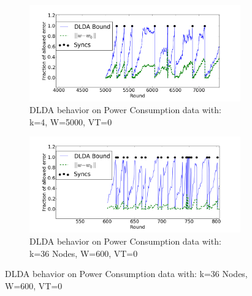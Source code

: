\begin{figure}
    \centering
    \begin{subfigure}[b]{0.8\textwidth}
        \includegraphics[width=\textwidth]{graphics/LDA/4nodes.png}
        \caption{DLDA behavior on Power Consumption data with: k=4, W=5000, VT=0}
    \end{subfigure}

    \begin{subfigure}[b]{0.8\textwidth}
        \includegraphics[width=\textwidth]{graphics/LDA/36nodes.png}
        \caption{DLDA behavior on Power Consumption data with: k=36 Nodes, W=600, VT=0}
    \end{subfigure}


\end{figure}

